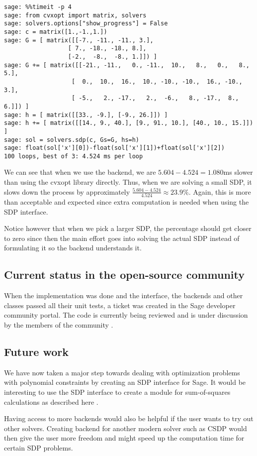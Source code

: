 \begin{verbatim}
sage: %%timeit -p 4 
sage: from cvxopt import matrix, solvers
sage: solvers.options["show_progress"] = False
sage: c = matrix([1.,-1.,1.])
sage: G = [ matrix([[-7., -11., -11., 3.],
                  [ 7., -18., -18., 8.],
                  [-2.,  -8.,  -8., 1.]]) ]
sage: G += [ matrix([[-21., -11.,   0., -11.,  10.,   8.,   0.,   8., 5.],
                   [  0.,  10.,  16.,  10., -10., -10.,  16., -10., 3.],
                   [ -5.,   2., -17.,   2.,  -6.,   8., -17.,  8., 6.]]) ]
sage: h = [ matrix([[33., -9.], [-9., 26.]]) ]
sage: h += [ matrix([[14., 9., 40.], [9., 91., 10.], [40., 10., 15.]]) ]
sage: sol = solvers.sdp(c, Gs=G, hs=h)
sage: float(sol['x'][0])-float(sol['x'][1])+float(sol['x'][2])
100 loops, best of 3: 4.524 ms per loop
\end{verbatim} 

We can see that when we use the backend, we are $5.604 - 4.524 = 1.080$ms slower than using the cvxopt library directly. Thus, when we are solving a small SDP, it slows down the process by approximately 
$\frac{5.604 - 4.524}{4.524} \approx 23.9\%$. Again, this is more than acceptable and expected since extra computation is needed when using the SDP interface. 

Notice however that when we pick a larger SDP, the percentage should get closer to zero since then the main effort goes into solving the actual SDP instead of formulating it so the backend understands it.


	\subsection{Current status in the open-source community}
When the implementation was done and the interface, the backends and other classes passed all their unit tests, a ticket was created in the Sage developer community portal. The code is currently being reviewed and is under discussion by the members of the community \cite{ticketsdp}.
	

	\subsection{Future work}
	We have now taken a major step towards dealing with optimization problems with polynomial constraints by creating an SDP interface for Sage. It would be interesting to use the SDP interface to create a module for sum-of-squares calculations as described here \cite{hol2004sum}. 

	Having access to more backends would also be helpful if the user wants to try out other solvers. Creating backend for another modern solver such as CSDP \cite{borchers1999csdp} would then give the user more freedom and might speed up the computation time for certain SDP problems. 
	
	
